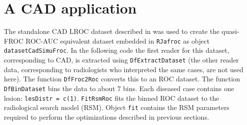 \documentclass[
]{book}
\newenvironment{Shaded}{\begin{snugshade}}{\end{snugshade}}
\newcommand{\CharTok}[1]{\textcolor[rgb]{0.31,0.60,0.02}{#1}}
\newcommand{\CommentTok}[1]{\textcolor[rgb]{0.56,0.35,0.01}{\textit{#1}}}
\newcommand{\DataTypeTok}[1]{\textcolor[rgb]{0.13,0.29,0.53}{#1}}
\newcommand{\DecValTok}[1]{\textcolor[rgb]{0.00,0.00,0.81}{#1}}
\newcommand{\KeywordTok}[1]{\textcolor[rgb]{0.13,0.29,0.53}{\textbf{#1}}}
\newcommand{\NormalTok}[1]{#1}
\newcommand{\OperatorTok}[1]{\textcolor[rgb]{0.81,0.36,0.00}{\textbf{#1}}}
\newcommand{\StringTok}[1]{\textcolor[rgb]{0.31,0.60,0.02}{#1}}
\begin{document}
\hypertarget{optim-op-point-application}{%
\section{A CAD application}\label{optim-op-point-application}}

The standalone CAD LROC dataset described in \citep{hupse2013standalone} was used to create the quasi-FROC ROC-AUC equivalent dataset embedded in \texttt{RJafroc} as object \texttt{datasetCadSimuFroc}. In the following code the first reader for this dataset, corresponding to CAD, is extracted using \texttt{DfExtractDataset} (the other reader data, corresponding to radiologists who interpreted the same cases, are not used here). The function \texttt{DfFroc2Roc} converts this to an ROC dataset. The function \texttt{DfBinDataset} bins the data to about 7 bins. Each diseased case contains one lesion: \texttt{lesDistr\ =\ c(1)}. \texttt{FitRsmRoc} fits the binned ROC dataset to the radiological search model (RSM). Object \texttt{fit} contains the RSM parameters required to perform the optimizations described in previous sections.

\begin{Shaded}
\end{Shaded}
\end{document}
